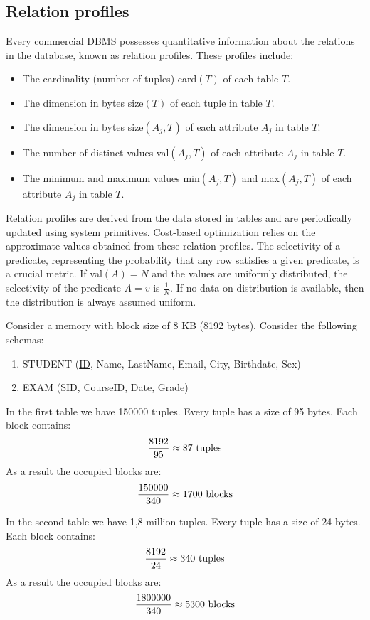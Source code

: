 \subsection{Relation profiles}
Every commercial DBMS possesses quantitative information about the relations in the database, known as relation profiles. 
These profiles include:
\begin{itemize}
    \item The cardinality (number of tuples) card$(T)$ of each table $T$.
    \item The dimension in bytes size$(T)$ of each tuple in table $T$.
    \item The dimension in bytes size$(A_j, T)$ of each attribute $A_j$ in table $T$.
    \item The number of distinct values val$(A_j, T)$ of each attribute $A_j$ in table $T$.
    \item The minimum and maximum values min$(A_j, T)$ and max$(A_j, T)$ of each attribute $A_j$ in table $T$.
\end{itemize}
Relation profiles are derived from the data stored in tables and are periodically updated using system primitives. 
Cost-based optimization relies on the approximate values obtained from these relation profiles.
The selectivity of a predicate, representing the probability that any row satisfies a given predicate, is a crucial metric.
If val$(A) = N$ and the values are uniformly distributed, the selectivity of the predicate $A = v$ is $\frac{1}{N}$.
If no data on distribution is available, then the distribution is always assumed uniform.
\begin{example}
    Consider a memory with block size of 8 KB (8192 bytes). 
    Consider the following schemas: 
    \begin{enumerate}
        \item STUDENT (\underline{ID}, Name, LastName, Email, City, Birthdate, Sex)
        \item EXAM (\underline{SID}, \underline{CourseID}, Date, Grade)
    \end{enumerate}

    In the first table we have 150000 tuples. 
    Every tuple has a size of 95 bytes. 
    Each block contains: 
    \[\dfrac{8192}{95} \approx 87 \textnormal{ tuples}\]
    As a result the occupied blocks are: 
    \[\dfrac{150000}{340} \approx 1700 \textnormal{ blocks}\]

    In the second table we have 1,8 million tuples. 
    Every tuple has a size of 24 bytes. 
    Each block contains: 
    \[\dfrac{8192}{24} \approx 340 \textnormal{ tuples}\]
    As a result the occupied blocks are: 
    \[\dfrac{1800000}{340} \approx 5300 \textnormal{ blocks}\]
\end{example}

